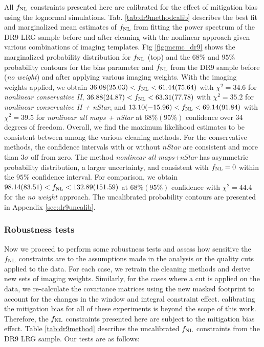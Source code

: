 All $f_{\rm NL}$ constraints presented here are calibrated for the effect of mitigation bias using the lognormal simulations. Tab. \ref{tab:dr9methodcalib} describes the best fit and marginalized mean estimates of $f_{\rm NL}$ from fitting the power spectrum of the DR9 LRG sample before and after cleaning with the nonlinear approach given various combinations of imaging templates. Fig \ref{fig:mcmc_dr9} shows the marginalized probability distribution for $f_{\rm NL}$ (top) and the $68\%$ and $95\%$ probability contours for the bias parameter and $f_{\rm NL}$ from the DR9 sample before (\textit{no weight}) and after applying various imaging weights. With the imaging weights applied, we obtain $36.08 (25.03) < f_{\rm NL} < 61.44(75.64)$ with $\chi^{2}=34.6$ for \textit{nonlinear conservative II}, $36.88(24.87) < f_{\rm NL} < 63.31(77.78)$ with $\chi^{2}=35.2$ for \textit{nonlinear conservative II + nStar}, and $13.10(-15.96) < f_{\rm NL} < 69.14(91.84)$ with $\chi^{2}=39.5$ for \textit{nonlinear all maps + nStar} at $68\% (95\%)$ confidence over 34 degrees of freedom. Overall, we find the maximum likelihood estimates to be consistent between among the various cleaning methods. For the conservative methods, the confidence intervals with or without $nStar$ are consistent and more than $3\sigma$ off from zero. The method \textit{nonlinear all maps+nStar} has asymmetric probability distribution, a larger uncertainty, and consistent with $f_{\rm NL}=0$ within the $95\%$ confidence interval. For comparison, we obtain $98.14(83.51) < f_{\rm NL} < 132.89(151.59)$ at $68\% (95\%)$ confidence with $\chi^{2}=44.4$ for the \textit{no weight} approach. The uncalibrated probability contours are presented in Appendix \ref{sec:dr9uncalib}.


\subsubsection{Robustness tests}
Now we proceed to perform some robustness tests and assess how sensitive the $f_{\rm NL}$ constraints are to the assumptions made in the analysis or the quality cuts applied to the data. For each case, we retrain the cleaning methods and derive new sets of imaging weights. Similarly, for the cases where a cut is applied on the data, we re-calculate the covariance matrices using the new masked footprint to account for the changes in the window and integral constraint effect. calibrating the mitigation bias for all of these experiments is beyond the scope of this work. Therefore, the $f_{\rm NL}$ constraints presented here are subject to the mitigation bias effect. Table \ref{tab:dr9method} describes the uncalibrated $f_{\rm NL}$ constraints from the DR9 LRG sample. Our tests are as follows:

